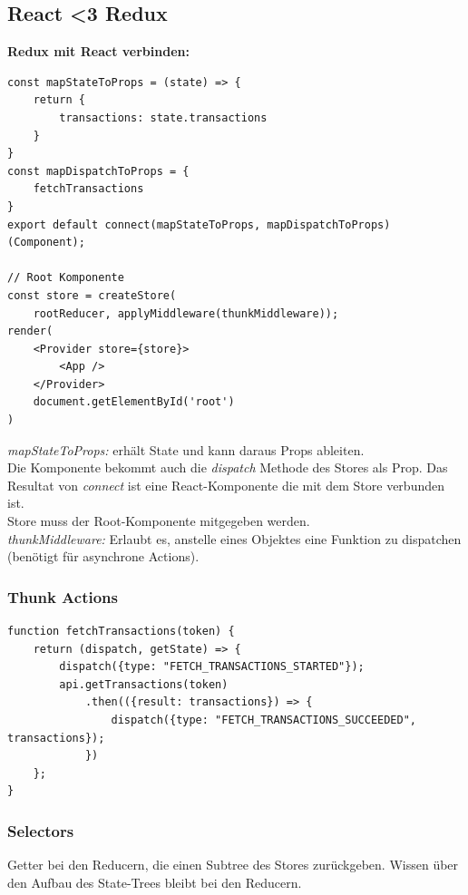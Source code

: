 \subsection{React \textless 3 Redux}
\textbf{Redux mit React verbinden:}
\begin{lstlisting}
const mapStateToProps = (state) => {
    return {
        transactions: state.transactions
    }
}
const mapDispatchToProps = {
    fetchTransactions
}
export default connect(mapStateToProps, mapDispatchToProps)(Component);

// Root Komponente
const store = createStore(
    rootReducer, applyMiddleware(thunkMiddleware));
render(
    <Provider store={store}>
        <App />
    </Provider>
    document.getElementById('root')
)
\end{lstlisting}
\textit{mapStateToProps:} erhält State und kann daraus Props ableiten.\\
Die Komponente bekommt auch die \textit{dispatch} Methode des Stores als Prop.
Das Resultat von \textit{connect} ist eine React-Komponente die mit dem Store verbunden ist.\\
Store muss der Root-Komponente mitgegeben werden.\\
\textit{thunkMiddleware:} Erlaubt es, anstelle eines Objektes eine Funktion zu dispatchen (benötigt für asynchrone Actions).

\subsubsection{Thunk Actions}
\begin{lstlisting}
function fetchTransactions(token) {
    return (dispatch, getState) => {
        dispatch({type: "FETCH_TRANSACTIONS_STARTED"});
        api.getTransactions(token)
            .then(({result: transactions}) => {
                dispatch({type: "FETCH_TRANSACTIONS_SUCCEEDED", transactions});
            })
    };
}
\end{lstlisting}

\subsubsection{Selectors}
Getter bei den Reducern, die einen Subtree des Stores zurückgeben.
Wissen über den Aufbau des State-Trees bleibt bei den Reducern.